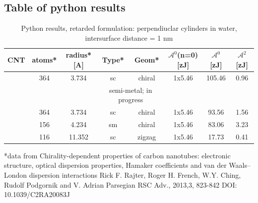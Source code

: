 \documentclass[a4paper]{article}
\begin{document}
\begin{center}
\section{Table of python results}
\begin{table}[ht]
\caption{Python results, retarded formulation: perpendiuclar cylinders in water, intersurface distance = 1 nm}
\centering
\begin{tabular}{c|c|c|c|c|c|c|c}
  \hline  
  CNT\hspace{0.05in}&atoms*\hspace{0.05in}&radius*[A]\hspace{0.05in}&Type*\hspace{0.05in}&Geom*\hspace{0.05in}&$\mathcal{A}^{0}$(n=0) [zJ]\hspace{0.05in}&$\mathcal{A}^{0}$
  [zJ]\hspace{0.05in}&$\mathcal{A}^{2}$ [zJ]\\
  \hline\hline 
  [6,5]    &364    &3.734      &sc     &chiral     &1x5.46     &105.46    &0.96 \\
  \hline      
  [9,0] &  &   & \multicolumn{2}{c}{semi-metal; in progress}\\
  \hline      
  [9,1]    &364    &3.734      &sc     &chiral     &1x5.46     &93.56      &1.56 \\
  \hline      
  [9,3]    &156    &4.234      &sm     &chiral     &1x5.46     &83.06      &3.23 \\
  \hline      
  [29,0]   &116    &11.352     &sc     &zigzag     &1x5.46     &17.73      &0.41 \\
  \hline  
\end{tabular}
\label{table:nonlin}
\end{table}
*data from 
Chirality-dependent properties of carbon nanotubes: electronic structure, optical dispersion properties, Hamaker coefficients and van der Waals–London dispersion interactions
Rick F. Rajter, Roger H. French, W.Y. Ching, Rudolf Podgornik and V. Adrian Parsegian  
RSC Adv., 2013,3, 823-842
DOI: 10.1039/C2RA20083J


\end{center}
\end{document}

